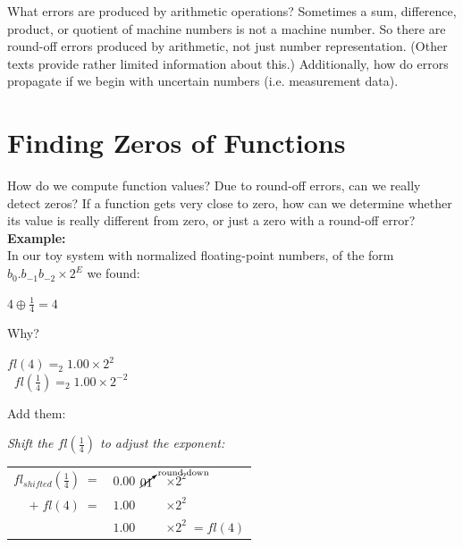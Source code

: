 \documentclass[a4paper,12pt,]{report}
\begin{document}
	What errors are produced by arithmetic operations?  Sometimes a sum, difference, product, or 
	quotient of machine numbers is not a machine number. So there are round-off errors produced by 
	arithmetic, not just number representation. (Other texts provide rather limited information about 
	this.) Additionally, how do errors propagate if we begin with uncertain numbers (i.e. measurement 
	data). \\

\section{Finding Zeros of Functions}

	How do we compute function values? Due to round-off errors, can we really detect zeros? If a 
	function gets very close to zero, how can we determine whether its value is really different from 
	zero, or just a zero with a round-off error?\\

	\noindent \textbf{Example:}\medskip\\
	
	\noindent In our toy system with normalized floating-point numbers, of the form 
	$b_0.b_{-1}b_{-2}\times 2^E$ we found:

\begin{center}
	$4\oplus \frac{1}{4} = 4$\\
	\bigskip
\end{center}

	Why?

\begin{center}
	$fl(4)=_2 1.00\times 2^2$\\
	\medskip
	$\; \; fl(\frac{1}{4})=_2 1.00\times 2^{-2}$
\end{center}

	Add them:

\begin{center}
	\textit{Shift the $fl(\frac{1}{4})$ to adjust the exponent:}\\
	\medskip
\begin{tabular}{rcll}
	$fl_{shifted}(\frac{1}{4})\;=$ & $\!\!0.00$ & $\!\!\!\!\cancelto{\text{round down}}{01}$ & $\times 2^2$\\
	$+ \; fl(4)\;=$ & $\!\!1.00$ & & $\times 2^2$\\
	\hline
	& $\!\!1.00$ & & $\times 2^2 \; = fl(4)$\\
\end{tabular}
\end{center}
	\bigskip
\end{document}
